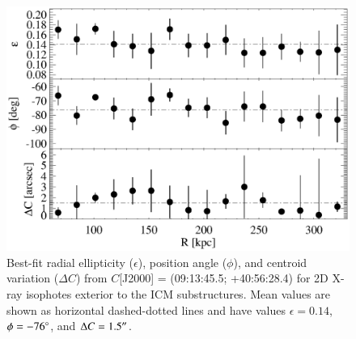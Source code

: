 \begin{figure}
  \begin{center}
    \begin{minipage}{0.5\linewidth}
      \includegraphics*[width=\textwidth, trim=15mm 10mm 10mm 10mm, clip]{ellpa.ps}
      \caption{Best-fit radial ellipticity ($\epsilon$), position
        angle ($\phi$), and centroid variation ($\Delta C$) from
        $C$[J2000] = (09:13:45.5; +40:56:28.4) for 2D X-ray isophotes
        exterior to the ICM substructures. Mean values are shown as
        horizontal dashed-dotted lines and have values $\epsilon =
        0.14$, $\phi = -76\rm{^{\circ}}$, and $\Delta C = 1.5\rm{^\prime}\hskip -0.1em\rm{^\prime}$.}
      \label{fig:ellpa}
    \end{minipage}
  \end{center}
\end{figure}

